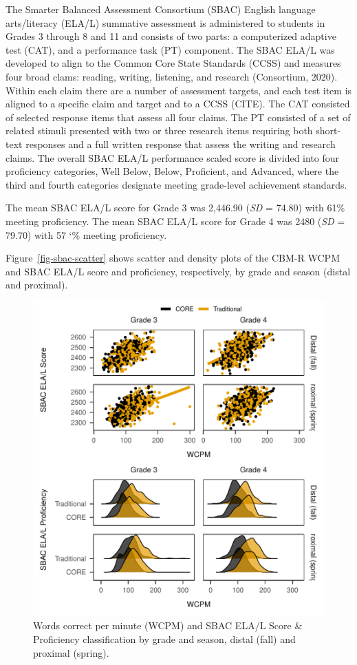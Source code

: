 \documentclass[
  english,
  man, fleqn, noextraspace]{apa6}
\begin{document}
The Smarter Balanced Assessment Consortium (SBAC) English language arts/literacy (ELA/L) summative assessment is administered to students in Grades 3 through 8 and 11 and consists of two parts: a computerized adaptive test (CAT), and a performance task (PT) component. The SBAC ELA/L was developed to align to the Common Core State Standards (CCSS) and measures four broad clams: reading, writing, listening, and research (Consortium, 2020). Within each claim there are a number of assessment targets, and each test item is aligned to a specific claim and target and to a CCSS (CITE). The CAT consisted of selected response items that assess all four claims. The PT consisted of a set of related stimuli presented with two or three research items requiring both short-text responses and a full written response that assess the writing and research claims. The overall SBAC ELA/L performance scaled score is divided into four proficiency categories, Well Below, Below, Proficient, and Advanced, where the third and fourth categories designate meeting grade-level achievement standards.

The mean SBAC ELA/L score for Grade 3 was 2,446.90 (\emph{SD} = 74.80) with 61\% meeting proficiency. The mean SBAC ELA/L score for Grade 4 was 2480 (\emph{SD} = 79.70) with 57 `\% meeting proficiency.

Figure~\ref{fig-sbac-scatter} shows scatter and density plots of the CBM-R WCPM and SBAC ELA/L score and proficiency, respectively, by grade and season (distal and proximal).



\begin{figure}
\centering
\includegraphics{conseq_validity_manusript_files/figure-latex/fig-sbac-scatter-1.pdf}
\caption{\label{fig:fig-sbac-scatter}Words correct per minute (WCPM) and SBAC ELA/L Score \& Proficiency classification by grade and season, distal (fall) and proximal (spring).}
\end{figure}
\end{document}

